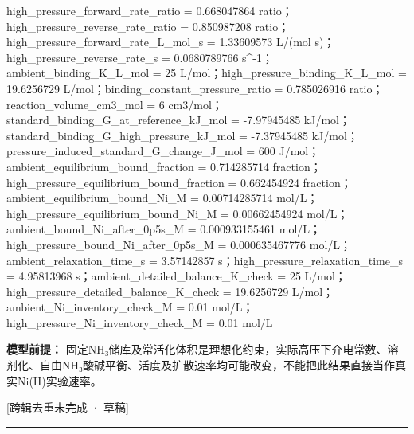 \documentclass[UTF8,11pt,a4paper]{ctexart}
\begin{document}
high\_pressure\_forward\_rate\_ratio = 0.668047864 ratio；high\_pressure\_reverse\_rate\_ratio = 0.850987208 ratio；high\_pressure\_forward\_rate\_L\_mol\_s = 1.33609573 L/(mol s)；high\_pressure\_reverse\_rate\_s = 0.0680789766 s\textasciicircum{}-1；ambient\_binding\_K\_L\_mol = 25 L/mol；high\_pressure\_binding\_K\_L\_mol = 19.6256729 L/mol；binding\_constant\_pressure\_ratio = 0.785026916 ratio；reaction\_volume\_cm3\_mol = 6 cm3/mol；standard\_binding\_G\_at\_reference\_kJ\_mol = -7.97945485 kJ/mol；standard\_binding\_G\_high\_pressure\_kJ\_mol = -7.37945485 kJ/mol；pressure\_induced\_standard\_G\_change\_J\_mol = 600 J/mol；ambient\_equilibrium\_bound\_fraction = 0.714285714 fraction；high\_pressure\_equilibrium\_bound\_fraction = 0.662454924 fraction；ambient\_equilibrium\_bound\_Ni\_M = 0.00714285714 mol/L；high\_pressure\_equilibrium\_bound\_Ni\_M = 0.00662454924 mol/L；ambient\_bound\_Ni\_after\_0p5s\_M = 0.000933155461 mol/L；high\_pressure\_bound\_Ni\_after\_0p5s\_M = 0.000635467776 mol/L；ambient\_relaxation\_time\_s = 3.57142857 s；high\_pressure\_relaxation\_time\_s = 4.95813968 s；ambient\_detailed\_balance\_K\_check = 25 L/mol；high\_pressure\_detailed\_balance\_K\_check = 19.6256729 L/mol；ambient\_Ni\_inventory\_check\_M = 0.01 mol/L；high\_pressure\_Ni\_inventory\_check\_M = 0.01 mol/L\par
\noindent\textbf{模型前提：}
固定NH₃储库及常活化体积是理想化约束，实际高压下介电常数、溶剂化、自由NH₃酸碱平衡、活度及扩散速率均可能改变，不能把此结果直接当作真实Ni(II)实验速率。\par
\noindent\textcolor{red!65!black}{[跨辑去重未完成 · 草稿]} \par
\medskip\hrule\medskip
{}
\end{document}
